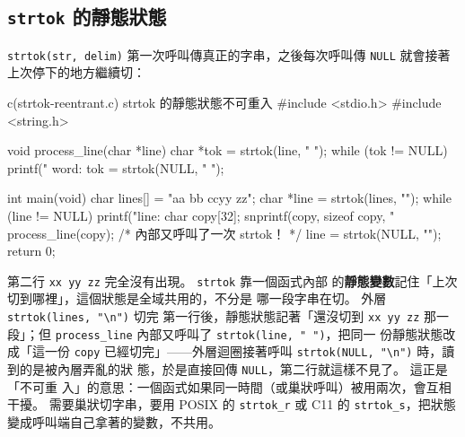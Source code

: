 
\subsection{\texttt{strtok} 的靜態狀態}

\texttt{strtok(str, delim)} 第一次呼叫傳真正的字串，之後每次呼叫傳
\texttt{NULL} 就會接著上次停下的地方繼續切：

\begin{example}{c}{(strtok-reentrant.c) strtok 的靜態狀態不可重入}
#include <stdio.h>
#include <string.h>

void process_line(char *line) {
    char *tok = strtok(line, " ");
    while (tok != NULL) {
        printf("  word: %
        tok = strtok(NULL, " ");
    }
}

int main(void) {
    char lines[] = "aa bb cc\nxx yy zz";
    char *line = strtok(lines, "\n");
    while (line != NULL) {
        printf("line: %
        char copy[32];
        snprintf(copy, sizeof copy, "%
        process_line(copy); /* 內部又呼叫了一次 strtok！ */
        line = strtok(NULL, "\n");
    }
    return 0;
}
\end{example}


第二行 \texttt{xx yy zz} 完全沒有出現。 \texttt{strtok} 靠一個函式內部
的\textbf{靜態變數}記住「上次切到哪裡」，這個狀態是全域共用的，不分是
哪一段字串在切。 外層 \texttt{strtok(lines, "\textbackslash n")} 切完
第一行後，靜態狀態記著「還沒切到 \texttt{xx yy zz} 那一段」；但
\texttt{process\_line} 內部又呼叫了 \texttt{strtok(line, " ")}，把同一
份靜態狀態改成「這一份 \texttt{copy} 已經切完」——外層迴圈接著呼叫
\texttt{strtok(NULL, "\textbackslash n")} 時，讀到的是被內層弄亂的狀
態，於是直接回傳 \texttt{NULL}，第二行就這樣不見了。 這正是「不可重
入」的意思：一個函式如果同一時間（或巢狀呼叫）被用兩次，會互相干擾。
需要巢狀切字串，要用 POSIX 的 \texttt{strtok\_r} 或 C11 的
\texttt{strtok\_s}，把狀態變成呼叫端自己拿著的變數，不共用。

